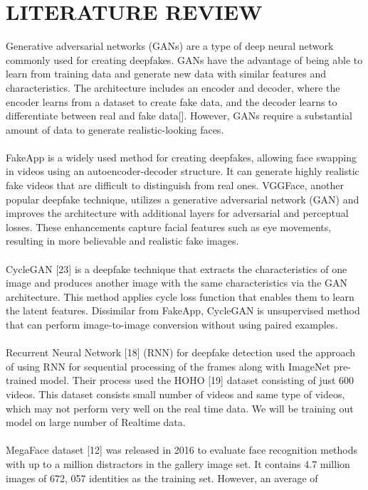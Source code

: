 \section{LITERATURE REVIEW}
Generative adversarial networks (GANs) are a type of deep neural network commonly used for creating deepfakes. GANs have the advantage of being able to learn from training data and generate new data with similar features and characteristics. The architecture includes an encoder and decoder, where the encoder learns from a dataset to create fake data, and the decoder learns to differentiate between real and fake data[]. However, GANs require a substantial amount of data to generate realistic-looking faces.
\\\\
FakeApp is a widely used method for creating deepfakes, allowing face swapping in videos using an autoencoder-decoder structure. It can generate highly realistic fake videos that are difficult to distinguish from real ones. VGGFace, another popular deepfake technique, utilizes a generative adversarial network (GAN) and improves the architecture with additional layers for adversarial and perceptual losses. These enhancements capture facial features such as eye movements, resulting in more believable and realistic fake images.
\\\\
CycleGAN [23] is a deepfake technique that extracts the characteristics of one image and produces another image with the same characteristics via the GAN architecture. This method applies cycle loss function that enables them to learn the latent features. Dissimilar from FakeApp, CycleGAN is unsupervised method that can perform image-to-image conversion without using paired examples.
\\\\
Recurrent Neural Network [18] (RNN) for deepfake detection used the approach of using RNN for sequential processing of the frames along with ImageNet pre-trained model. Their process used the HOHO [19] dataset consisting
of just 600 videos.
This dataset consists small number of videos and same type of videos, which
may not perform very well on the real time data. We will be training out model
on large number of Realtime data.
\\\\
MegaFace dataset [12] was released in 2016 to evaluate
face recognition methods with up to a million distractors
in the gallery image set. It contains 4.7 million images of
672, 057 identities as the training set. However, an average of
